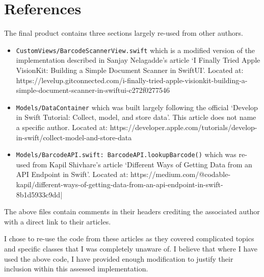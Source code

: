 \documentclass[11pt, oneside]{article}   	%
\begin{document}
\section{References}
The final product contains three sections largely re-used from other authors.
\begin{itemize}
	\item \verb|CustomViews/BarcodeScannerView.swift| which is a modified version of the implementation described in Sanjay Nelagadde's article `I Finally Tried Apple VisionKit: Building a Simple Document Scanner in SwiftUI'.
	Located at: https://levelup.gitconnected.com/i-finally-tried-apple-visionkit-building-a-simple-document-scanner-in-swiftui-c272f0277546
	\item \verb|Models/DataContainer| which was built largely following the official `Develop in Swift Tutorial: Collect, model, and store data'. This article does not name a specific author.
	Located at: https://developer.apple.com/tutorials/develop-in-swift/collect-model-and-store-data
	\item \verb|Models/BarcodeAPI.swift: BarcodeAPI.lookupBarcode()| which was re-used from Kapil Shivhare's article `Different Ways of Getting Data from an API Endpoint in Swift'.
	Located at: https://medium.com/@codable-kapil/different-ways-of-getting-data-from-an-api-endpoint-in-swift-8b1d5933c9dd|
\end{itemize} 
The above files contain comments in their headers crediting the associated author with a direct link to their articles.

I chose to re-use the code from these articles as they covered complicated topics and specific classes that I was completely unaware of. I believe that where I have used the above code, I have provided enough modification to justify their inclusion within this assessed implementation.
\end{document}
